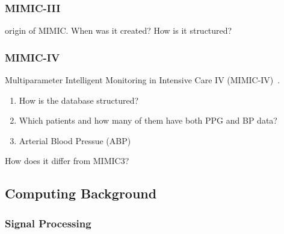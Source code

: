 \documentclass[12pt, bibliography=totoc]{scrartcl}
\begin{document}
\subsubsection{MIMIC-III}
\label{mimic3}

origin of MIMIC\@.
When was it created?
How is it structured?

\subsubsection{MIMIC-IV}
\label{mimic4}

Multiparameter Intelligent Monitoring in Intensive Care IV (MIMIC-IV)~\cite{johnson_mimic-iv_2023}.

\begin{enumerate}
        \item How is the database structured?
\item Which patients and how many of them have both PPG and BP data?
\item Arterial Blood Pressue (ABP)
\end{enumerate}

How does it differ from MIMIC3?

\subsection{Computing Background}
\label{computing_background}

\subsubsection{Signal Processing}
\label{signal_processing}
\end{document}
